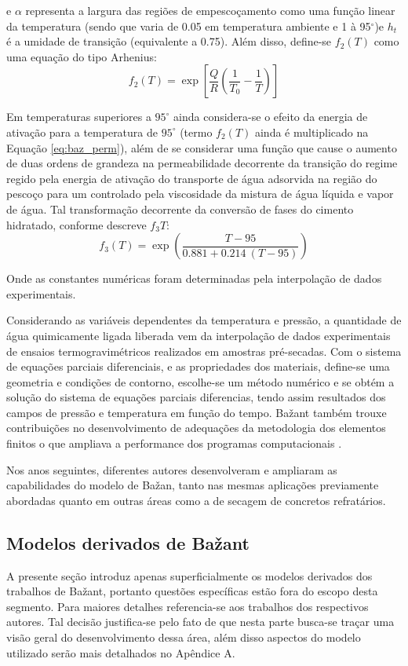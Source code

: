 e $\alpha$ representa a largura das regiões de empescoçamento como uma função
linear da temperatura (sendo que varia de 0.05 em temperatura ambiente e 1 à
95$^{\circ}$)e $h_t$ é a umidade de transição (equivalente a 0.75). Além disso,
define-se $f_2(T)$ como uma equação do tipo Arhenius:
\begin{equation}
  \label{eq:f2}
  f_2(T)  = \exp{\left[\frac{Q}{R}\left( \frac{1}{T_0} - \frac{1}{T} \right) \right]}
\end{equation}
    
    
Em temperaturas superiores a $95^{\circ}$ ainda considera-se o efeito da energia
de ativação para a temperatura de $95^{\circ}$ (termo $f_2(T)$ ainda é
multiplicado na Equação \ref{eq:baz_perm}), além de se considerar uma função
que cause o aumento de duas ordens de grandeza na permeabilidade decorrente da
transição do regime regido pela energia de ativação do transporte de água
adsorvida na região do pescoço para um controlado pela viscosidade da mistura de
água líquida e vapor de água. Tal transformação decorrente da conversão de fases
do cimento hidratado, conforme descreve $f_3{T}$:
\begin{equation}
  \label{eq:f3}
  f_3(T) = \exp{\left( \frac{T-95}{0.881+0.214 \ (T-95)} \right)}
\end{equation}

Onde as constantes numéricas foram determinadas pela interpolação de dados
experimentais.

Considerando as variáveis dependentes da temperatura e pressão, a quantidade de
água quimicamente ligada liberada vem da interpolação de dados experimentais de
ensaios termogravimétricos realizados em amostras pré-secadas. Com o sistema de
equações parciais diferenciais, e as propriedades dos materiais, define-se uma
geometria e condições de contorno, escolhe-se um método numérico e se obtém a
solução do sistema de equações parciais diferencias, tendo assim resultados dos
campos de pressão e temperatura em função do tempo. Ba\v{z}ant também trouxe
contribuições no desenvolvimento de adequações da metodologia dos elementos
finitos o que ampliava a performance dos programas computacionais \cite{bazant1978}.

Nos anos seguintes, diferentes autores desenvolveram e ampliaram as
capabilidades do modelo de Ba\v{z}an, tanto nas mesmas aplicações previamente
abordadas quanto em outras áreas como a de secagem de concretos refratários.
    
    
\subsection{Modelos derivados de Ba\v{z}ant}\label{sec:deriv_bazant}
A presente seção introduz apenas superficialmente os modelos derivados dos
trabalhos de Ba\v{z}ant, portanto questões específicas estão fora do escopo
desta segmento. Para maiores detalhes referencia-se aos trabalhos dos respectivos
autores. Tal decisão justifica-se pelo fato de que nesta parte busca-se traçar
uma visão geral do desenvolvimento dessa área, além disso aspectos do modelo
utilizado serão mais detalhados no Apêndice A.

